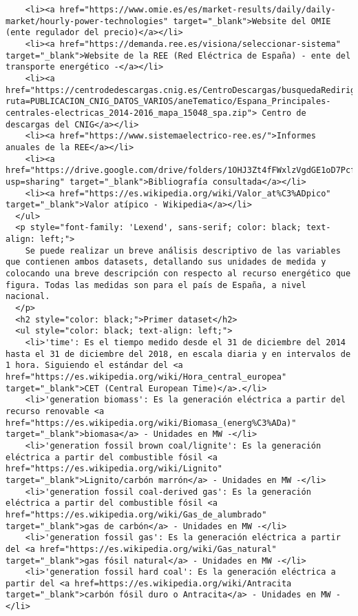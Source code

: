 \documentclass[11pt]{article}
\begin{document}
\begin{verbatim}
    <li><a href="https://www.omie.es/es/market-results/daily/daily-market/hourly-power-technologies" target="_blank">Website del OMIE (ente regulador del precio)</a></li>
    <li><a href="https://demanda.ree.es/visiona/seleccionar-sistema" target="_blank">Website de la REE (Red Eléctrica de España) - ente del transporte energético -</a></li>
    <li><a href="https://centrodedescargas.cnig.es/CentroDescargas/busquedaRedirigida.do?ruta=PUBLICACION_CNIG_DATOS_VARIOS/aneTematico/Espana_Principales-centrales-electricas_2014-2016_mapa_15048_spa.zip"> Centro de descargas del CNIG</a></li>
    <li><a href="https://www.sistemaelectrico-ree.es/">Informes anuales de la REE</a></li>
    <li><a href="https://drive.google.com/drive/folders/1OHJ3Zt4fFWxlzVgdGE1oD7PcfASJOYl6?usp=sharing" target="_blank">Bibliografía consultada</a></li>
    <li><a href="https://es.wikipedia.org/wiki/Valor_at%C3%ADpico" target="_blank">Valor atípico - Wikipedia</a></li>
  </ul>
  <p style="font-family: 'Lexend', sans-serif; color: black; text-align: left;">
    Se puede realizar un breve análisis descriptivo de las variables que contienen ambos datasets, detallando sus unidades de medida y colocando una breve descripción con respecto al recurso energético que figura. Todas las medidas son para el país de España, a nivel nacional.
  </p>
  <h2 style="color: black;">Primer dataset</h2>
  <ul style="color: black; text-align: left;">
    <li>'time': Es el tiempo medido desde el 31 de diciembre del 2014 hasta el 31 de diciembre del 2018, en escala diaria y en intervalos de 1 hora. Siguiendo el estándar del <a href="https://es.wikipedia.org/wiki/Hora_central_europea" target="_blank">CET (Central European Time)</a>.</li>
    <li>'generation biomass': Es la generación eléctrica a partir del recurso renovable <a href="https://es.wikipedia.org/wiki/Biomasa_(energ%C3%ADa)" target="_blank">biomasa</a> - Unidades en MW -</li>
    <li>'generation fossil brown coal/lignite': Es la generación eléctrica a partir del combustible fósil <a href="https://es.wikipedia.org/wiki/Lignito" target="_blank">Lignito/carbón marrón</a> - Unidades en MW -</li>
    <li>'generation fossil coal-derived gas': Es la generación eléctrica a partir del combustible fósil <a href="https://es.wikipedia.org/wiki/Gas_de_alumbrado" target="_blank">gas de carbón</a> - Unidades en MW -</li>
    <li>'generation fossil gas': Es la generación eléctrica a partir del <a href="https://es.wikipedia.org/wiki/Gas_natural" target="_blank">gas fósil natural</a> - Unidades en MW -</li>
    <li>'generation fossil hard coal': Es la generación eléctrica a partir del <a href=https://es.wikipedia.org/wiki/Antracita target="_blank">carbón fósil duro o Antracita</a> - Unidades en MW -</li>

\end{verbatim}
\end{document}
